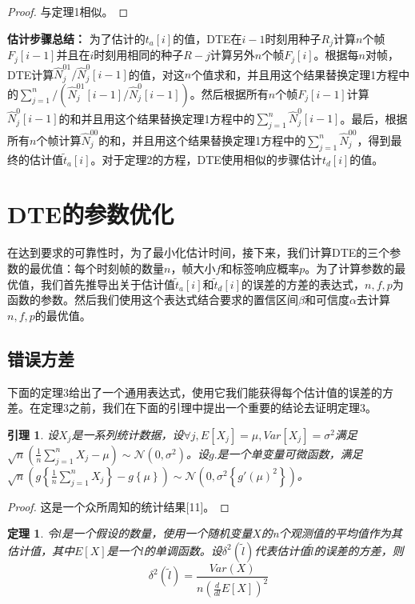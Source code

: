 \documentclass[UTF8]{ctexart}
\newtheorem{theorem}{定理}
\newtheorem{lemma}{引理}
\newtheorem*{proof}{证明}
\begin{document}
\begin{proof}
	与定理1相似。
\end{proof}

\textbf{估计步骤总结：}
为了估计的$t_a[i]$的值，DTE在$i-1$时刻用种子$R_j$计算$n$个帧$F_j[i-1]$并且在$i$时刻用相同的种子$R-j$计算另外$n$个帧$F_j[i]$。根据每$n$对帧，DTE计算$\hat{N}^{01}_j/\hat{N}^0_j[i-1]$的值，对这$n$个值求和，并且用这个结果替换定理1方程中的$\sum_{j=1}^{n}/\left(\hat{N}^{01}_j[i-1]/\hat{N}^0_j[i-1]\right)$。然后根据所有$n$个帧$F_j[i-1]$计算$\hat{N}^0_j[i-1]$的和并且用这个结果替换定理1方程中的$\sum_{j=1}^{n}\hat{N}^0_j[i-1]$。最后，根据所有$n$个帧计算$\hat{N}^{00}_j$的和，并且用这个结果替换定理1方程中的$\sum_{j=1}^{n}\hat{N}^{00}_j$，得到最终的估计值$\widetilde{t}_a[i]$。对于定理2的方程，DTE使用相似的步骤估计$t_d[i]$的值。

\section{DTE的参数优化}
在达到要求的可靠性时，为了最小化估计时间，接下来，我们计算DTE的三个参数的最优值：每个时刻帧的数量$n$，帧大小$f$和标签响应概率$p$。为了计算参数的最优值，我们首先推导出关于估计值$\widetilde{t}_a[i]$和$\widetilde{t}_d[i]$的误差的方差的表达式，$n,f,p$为函数的参数。然后我们使用这个表达式结合要求的置信区间$\beta$和可信度$\alpha$去计算$n,f,p$的最优值。

\subsection{错误方差}
下面的定理3给出了一个通用表达式，使用它我们能获得每个估计值的误差的方差。在定理3之前，我们在下面的引理中提出一个重要的结论去证明定理3。

\begin{lemma}
设$X_j$是一系列统计数据，设$\forall j,E[X_j]=\mu,Var[X_j]=\sigma^2$满足$\sqrt{n}\left(\frac{1}{n}\sum_{j=1}^{n}X_j-\mu\right)\sim \mathcal{N}(0,\sigma^2)$。设$g{.}$是一个单变量可微函数，满足\\$\sqrt{n}\left(g\left\{\frac{1}{n}\sum_{j=1}^{n}X_j\right\}-g\left\{\mu\right\}\right)\sim \mathcal{N}\left(0,\sigma^2\left\{g'(\mu)^2\right\}\right)$。
\end{lemma}

\begin{proof}
这是一个众所周知的统计结果[11]。
\end{proof}

\begin{theorem}
令$l$是一个假设的数量，使用一个随机变量$X$的n个观测值的平均值作为其估计值，其中$E[X]$是一个$l$的单调函数。设$\delta^2(\widetilde{l})$代表估计值$\widetilde{l}$的误差的方差，则
\begin{equation}
\delta^2(\widetilde{l})=\frac{Var\left(X\right)}{n\left(\frac{d}{dl}E[X]\right)^2}
\end{equation}
\end{theorem}
\end{document}
